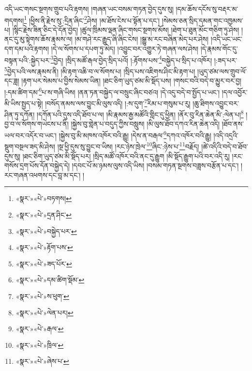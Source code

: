 འདི་ཡང་གསང་སྔགས་གྲུབ་པའི་རྟགས། །གཞན་ཡང་བསམ་གཏན་བྱེད་དུས་སུ། །དམ་ཆོས་དངོས་སུ་བརྡར་མ་གདགས།\footnote{«སྣར་»«པེ་»བཏགས།} །ཕྱིས་ནི་རྗེས་སུ་:དྲིན་ཞིང་\footnote{«སྣར་»«པེ་»དྲན་ཤིང་}ཤེས། །མ་ཐོས་ངེས་པ་སྟོན་པ་དང་། །སེམས་ཅན་སྲིད་དམན་གང་འཁྱམས་པ། །སྙིང་རྗེས་ཟིན་ཅིང་དེ་དོན་བྱེད། །ཚུལ་ཁྲིམས་ལྡན་ཞིང་གསང་སྔགས་མོས། །ཐེག་པ་ཐུན་མོང་གཅིག་ཏུ་ཤེས། །ནང་དུ་མུ་སྟེགས་ཆོས་རྣམས་ལ། །མ་གཤེ་རང་རྒྱུད་ཞི་ཞིང་ངེས། །སྒྱུ་མ་རང་བཞིན་མེད་པར་ཤེས། །འདི་ཡང་ཡང་དག་དམ་པའི་རྟགས། །དེ་ལ་སོགས་པ་དཔག་ཏུ་མེད། །འབྱུང་བར་འགྱུར་ཏེ་གཞན་ལས་ཤེས། །དེ་རྣམས་གོང་དུ་བསྟན་པའི་:སྐྱེད་པར་\footnote{«སྣར་»«པེ་»བསྐྱེད་པར་}བྱེད། །སྲིད་མཚོ་རྒལ་བྱེད་སྲིད་པའོ། །:རྟོགས་པས་\footnote{«སྣར་»«པེ་»རྟོག་པས་}བསྐྱེད་པ་སྲིད་པ་འཁོར། །:ཟད་པར་\footnote{«སྣར་»«པེ་»ཟད་པོར་}བྱེད་པའི་ལས་རྣམས་ནི། །མི་རྟག་འཆི་བ་ལ་སོགས་པ། །སྲིད་པས་འཇིགས་ཤིང་མི་རྟག་པ། །ཡུད་ཙམ་ལས་གྲུབ་ལོ་དང་ཟླ། །རྟག་པར་སེམས་པ་བྱིས་སེམས་ཡིན། །ཐང་ཅིག་ཡུད་ཙམ་མི་སྡོད་པས། །གསང་བའི་བདེ་བ་མྱུར་བར་བྱ། །:དམ་ཚིག་དམ་\footnote{«སྣར་»«པེ་»དམ་ཚིག་སྡོམ་}པ་ས་གཞི་ཡིས། །ནན་ཏན་བསྐྱེད་ལ་བསྲུང་ཞིང་བཙའ། །དེ་འདུ་བདེ་བ་སྤྱོད་པ་ཡང་། །དལ་འབྱོར་མི་ཡིས་སྤྱད་པ་སྟེ། །བསོད་ནམས་ལས་བྱུང་མི་ལུས་འདི། །:ས་དུག་\footnote{«སྣར་»«པེ་»ས་ཕུག་}རིམ་པ་གསུམ་པ་རུ། །ཆུ་ཐིགས་འབྱུང་བར་ཤིན་ཏུ་དཀོན། །དཀོན་པའི་དུས་འདི་ཐོབ་པ་ལ། །མི་རྣམས་རྒྱ་མཚོའི་གླིང་དུ་ཕྱིན། །ནོར་བུ་རིན་ཆེན་མི་:ལེན་པ།\footnote{«སྣར་»«པེ་»ལེན་པར།} །བྱ་བ་ལ་སོགས་གཡེངས་པ་ནི། །སྐྱེས་བུ་གླེན་པ་བདུད་ཀྱིས་བསླུས། །མི་ལུས་ཐོབ་དཀའ་རིན་ཆེན་འདི། །ཐོབ་ནས་ཡལ་བར་འདོར་བ་ཡང་། །སྐྱེས་བུ་མི་མཁས་འཁོར་བའི་རྒྱུ། །དེས་ན་བརྒལ་\footnote{«སྣར་»«པེ་»རྒལ་}དཀའ་འཁོར་བའི་རྒྱུ། །འདི་འདྲའི་སྡུག་བསྔལ་ཟད་མི་ཤེས། །སྔ་ཕྱི་དུས་སུ་བྱུང་བ་ཡིས། །རང་ཉེས་ཁྲེལ་\footnote{«སྣར་»«པེ་»ཁྲིལ་}ཞིང་:ཉེས་པ་\footnote{«སྣར་»«པེ་»ཞེས་པ་}བརྗོད། །ཚེ་འདིའི་བདེ་བ་ཐོབ་དུས་སུ། །ཐང་ཅིག་ཡུད་ཙམ་མི་སྡོད་པར། །སྲིད་མཚོ་འཁོར་བའི་ནང་དུ་རྒྱུག །མི་སྡོད་རྒྱུག་པའི་བར་འདི་རུ། །རང་གསོས་དྲག་པོས་དོན་བསྐྱེད་དེ། །དབང་པོ་མ་ཉམས་ལུས་འདི་ཡིས། །བསམ་གཏན་སྔགས་བཟླས་བརྩོན་པ་དང་། །རང་གཞན་འཕགས་དང་བླ་མ་དང་། །

